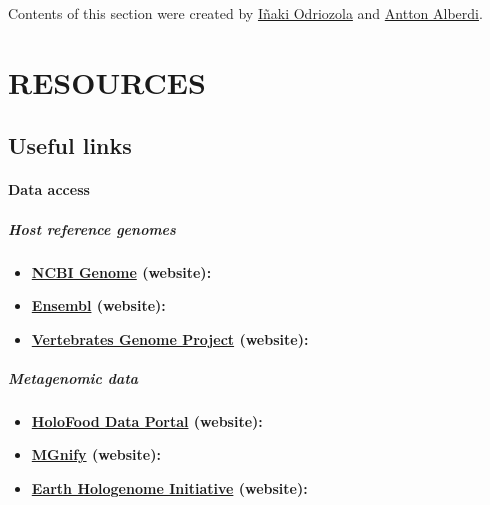 \documentclass[
]{book}
\providecommand{\tightlist}{%
  \setlength{\itemsep}{0pt}\setlength{\parskip}{0pt}}
\begin{document}
Contents of this section were created by \protect\hyperlink{inaki-odriozola}{Iñaki Odriozola} and \protect\hyperlink{antton-alberdi}{Antton Alberdi}.

\hypertarget{part-resources}{%
\part{RESOURCES}\label{part-resources}}

\hypertarget{useful-links}{%
\chapter{Useful links}\label{useful-links}}

\hypertarget{links-data}{%
\subsection*{Data access}\label{links-data}}

\hypertarget{host-reference-genomes}{%
\subsubsection*{Host reference genomes}\label{host-reference-genomes}}

\begin{itemize}
\tightlist
\item
  \textbf{\href{https://www.ncbi.nlm.nih.gov/genome/}{NCBI Genome} (website):}
\item
  \textbf{\href{https://www.ensembl.org/index.html}{Ensembl} (website):}
\item
  \textbf{\href{https://vertebrategenomesproject.org/}{Vertebrates Genome Project} (website):}
\end{itemize}

\hypertarget{metagenomic-data}{%
\subsubsection*{Metagenomic data}\label{metagenomic-data}}

\begin{itemize}
\tightlist
\item
  \textbf{\href{https://www.holofooddata.org/}{HoloFood Data Portal} (website):}
\item
  \textbf{\href{https://www.ebi.ac.uk/metagenomics/}{MGnify} (website):}
\item
  \textbf{\href{http://www.earthhologenome.org/database.html}{Earth Hologenome Initiative} (website):}
\end{itemize}
\end{document}
